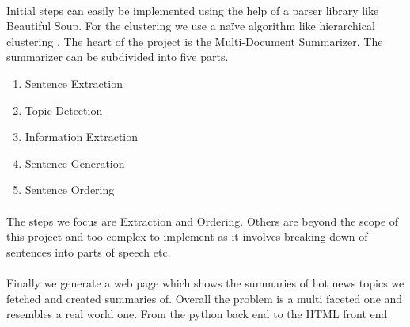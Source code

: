 \paragraph{} Initial steps can easily be implemented using the help of a parser library like Beautiful Soup\cite{BeautifulSoup}. For the clustering we use a naïve algorithm like hierarchical clustering \cite{HClustering}. The heart of the project is the Multi-Document Summarizer. The summarizer can be subdivided into five parts.
\begin{enumerate}[1. ]
 \item Sentence Extraction
 \item Topic Detection
 \item Information Extraction
 \item Sentence Generation
 \item Sentence Ordering
\end{enumerate}
	
\paragraph{} The steps we focus are Extraction and Ordering. Others are beyond the scope of this project and too complex to implement as it involves breaking down of sentences into parts of speech etc.

\paragraph{} Finally we generate a web page which shows the summaries of hot news topics we fetched and created summaries of. Overall the problem is a multi faceted one and resembles a real world one. From the python back end to the HTML front end.
